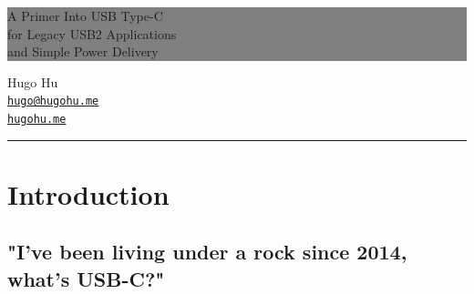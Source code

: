 \documentclass[12pt]{article}
\begin{document}
\begin{titlepage} 
	\colorbox{grey}{
		\parbox[t]{0.93\textwidth}{ 
			\parbox[t]{0.91\textwidth}{ 
				\raggedleft 
				\fontsize{50pt}{80pt}\selectfont 
				\vspace{0.7cm} 				
				A Primer Into USB Type-C\\
				for Legacy USB2 Applications\\
				and Simple Power Delivery\\
				
				\vspace{0.7cm} 
			}
		}
	}
	
	\vfill 		
	\parbox[t]{0.93\textwidth}{ 
		\raggedleft 
		\large 
		{\Large Hugo Hu}\\[4pt]
		\texttt{\href{mailto:hugo@hugohu.me}{hugo@hugohu.me}}\\
		\texttt{\href{https://hugohu.me}{hugohu.me}}\\
		
		\hfill\rule{0.2\linewidth}{1pt}
	}
	
\end{titlepage}


\tableofcontents
\newpage
\section{Introduction}
\subsection{"I've been living under a rock since 2014, what's USB-C?"}
\end{document}
